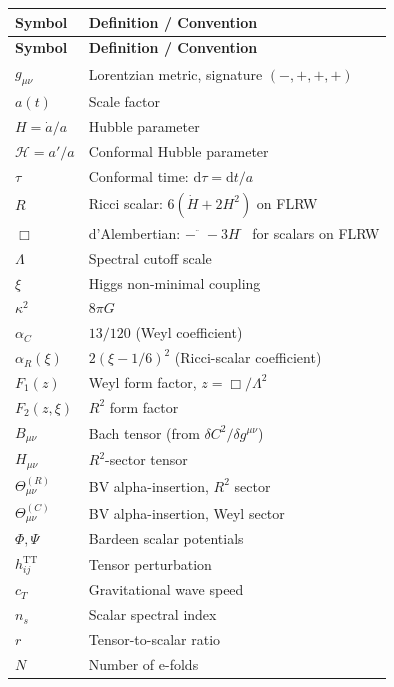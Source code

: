 \documentclass[12pt,a4paper]{article}
\theoremstyle{definition}
\theoremstyle{remark}
\newcommand{\dd}{\mathrm{d}}
\begin{document}
\begin{center}
\begin{longtable}{ll}
\toprule
\textbf{Symbol} & \textbf{Definition / Convention} \\
\midrule
\endfirsthead
\toprule
\textbf{Symbol} & \textbf{Definition / Convention} \\
\midrule
\endhead
\bottomrule
\endfoot
$g_{\mu\nu}$ & Lorentzian metric, signature $(-,+,+,+)$ \\
$a(t)$ & Scale factor \\
$H = \dot{a}/a$ & Hubble parameter \\
$\mathcal{H} = a'/a$ & Conformal Hubble parameter \\
$\tau$ & Conformal time: $\dd\tau = \dd t/a$ \\
$R$ & Ricci scalar: $6(\dot{H} + 2H^2)$ on FLRW \\
$\Box$ & d'Alembertian: $-\ddot{\phantom{x}} - 3H\dot{\phantom{x}}$
  for scalars on FLRW \\
$\Lambda$ & Spectral cutoff scale \\
$\xi$ & Higgs non-minimal coupling \\
$\kappa^2$ & $8\pi G$ \\
$\alpha_C$ & $13/120$ (Weyl coefficient) \\
$\alpha_R(\xi)$ & $2(\xi - 1/6)^2$ (Ricci-scalar coefficient) \\
$F_1(z)$ & Weyl form factor, $z = \Box/\Lambda^2$ \\
$F_2(z,\xi)$ & $R^2$ form factor \\
$B_{\mu\nu}$ & Bach tensor (from $\delta C^2/\delta g^{\mu\nu}$) \\
$H_{\mu\nu}$ & $R^2$-sector tensor \\
$\Theta^{(R)}_{\mu\nu}$ & BV alpha-insertion, $R^2$ sector \\
$\Theta^{(C)}_{\mu\nu}$ & BV alpha-insertion, Weyl sector \\
$\Phi, \Psi$ & Bardeen scalar potentials \\
$h_{ij}^{\mathrm{TT}}$ & Tensor perturbation \\
$c_T$ & Gravitational wave speed \\
$n_s$ & Scalar spectral index \\
$r$ & Tensor-to-scalar ratio \\
$N$ & Number of e-folds \\
\bottomrule
\end{longtable}
\end{center}
\end{document}
